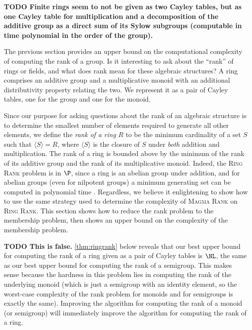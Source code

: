 \documentclass{article}
\newcommand{\todo}[1]{\textbf{TODO #1}}
\newcommand{\gen}[1]{\langle #1 \rangle}
\begin{document}
\todo{Finite rings seem to not be given as two Cayley tables, but as one Cayley table for multiplication and a decomposition of the additive group as a direct sum of its Sylow subgroups (computable in time polynomial in the order of the group).}

%
The previous section provides an upper bound on the computational complexity of computing the rank of a group.
Is it interesting to ask about the ``rank'' of rings or fields, and what does rank mean for these algebraic structures?
A ring comprises an additive group and a multiplicative monoid with an additional distributivity property relating the two.
We represent it as a pair of Cayley tables, one for the group and one for the monoid.

Since our purpose for asking questions about the rank of an algebraic structure is to determine the smallest number of elements required to generate all other elements, we define the \emph{rank of a ring $R$} to be the minimum cardinality of a set $S$ such that $\gen{S} = R$, where $\gen{S}$ is the closure of $S$ under \emph{both} addition and multiplication.
The rank of a ring is bounded above by the minimum of the rank of its additive group and the rank of its multiplicative monoid.  %
Indeed, the \textsc{Ring Rank} problem is in $\P$, since a ring is an abelian group under addition, and for abelian groups (even for nilpotent groups) a minimum generating set can be computed in polynomial time \autocite[Theorem~7]{at06}.
Regardless, we believe it enlightening to show how to use the same strategy used to determine the complexity of \textsc{Magma Rank} on \textsc{Ring Rank}.
This section shows how to reduce the rank problem to the membership problem, then shows an upper bound on the complexity of the membership problem.

%
\todo{This is false.}
\autoref{thm:ringrank} below reveals that our best upper bound for computing the rank of a ring given as a pair of Cayley tables is $\NL$, the same as our best upper bound for computing the rank of a semigroup.
This makes sense because the hardness in this problem lies in computing the rank of the underlying monoid (which is just a semigroup with an identity element, so the worst-case complexity of the rank problem for monoids and for semigroups is exactly the same).
Improving the algorithm for computing the rank of a monoid (or semigroup) will immediately improve the algorithm for computing the rank of a ring.
\end{document}
